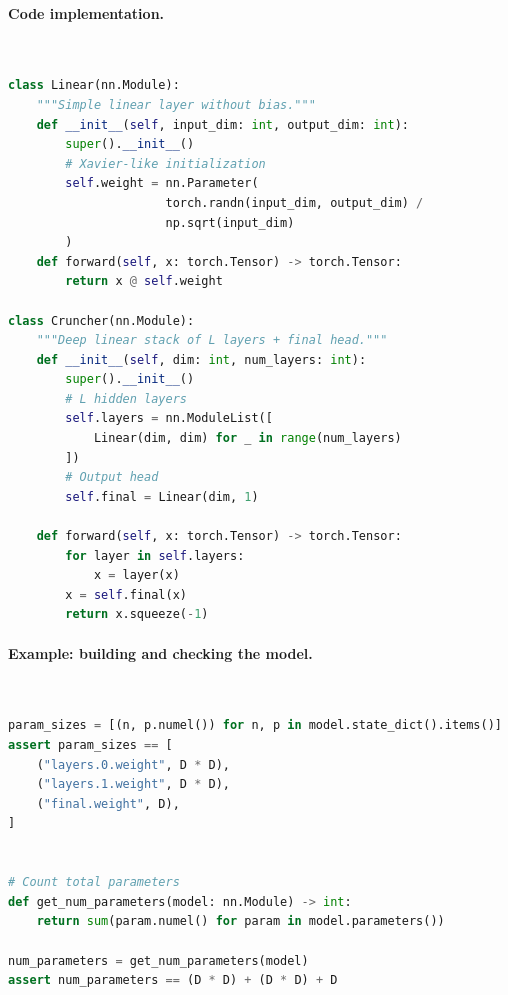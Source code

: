\paragraph{Code implementation.}~{}
\begin{lstlisting}[language=Python]
class Linear(nn.Module):
    """Simple linear layer without bias."""
    def __init__(self, input_dim: int, output_dim: int):
        super().__init__()
        # Xavier-like initialization
        self.weight = nn.Parameter(
                      torch.randn(input_dim, output_dim) / 
                      np.sqrt(input_dim)
        )
    def forward(self, x: torch.Tensor) -> torch.Tensor:
        return x @ self.weight

class Cruncher(nn.Module):
    """Deep linear stack of L layers + final head."""
    def __init__(self, dim: int, num_layers: int):
        super().__init__()
        # L hidden layers
        self.layers = nn.ModuleList([
            Linear(dim, dim) for _ in range(num_layers)
        ])
        # Output head
        self.final = Linear(dim, 1)

    def forward(self, x: torch.Tensor) -> torch.Tensor:
        for layer in self.layers:
            x = layer(x)
        x = self.final(x)
        return x.squeeze(-1)
\end{lstlisting}




\paragraph{Example: building and checking the model.}~{}
\begin{lstlisting}[language=Python]
param_sizes = [(n, p.numel()) for n, p in model.state_dict().items()]
assert param_sizes == [
    ("layers.0.weight", D * D),
    ("layers.1.weight", D * D),
    ("final.weight", D),
]


# Count total parameters
def get_num_parameters(model: nn.Module) -> int:
    return sum(param.numel() for param in model.parameters())

num_parameters = get_num_parameters(model)
assert num_parameters == (D * D) + (D * D) + D
\end{lstlisting}

